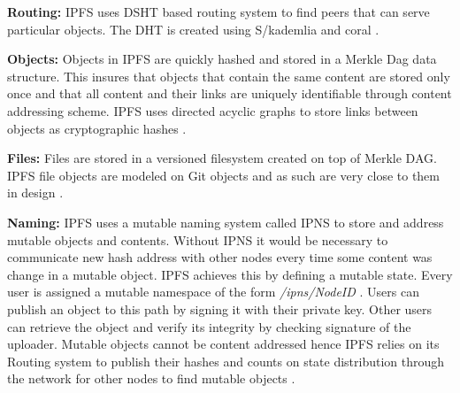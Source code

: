 \textbf{Routing:} IPFS uses DSHT based routing system to find peers that can serve particular objects. The DHT is created using S/kademlia and coral \cite{DBLP:journals/corr/Benet14}.

\textbf{Objects:} Objects in IPFS are quickly hashed and stored in a Merkle Dag data structure. This insures that objects that contain the same content are stored only once and that all content and their links are uniquely identifiable through content addressing scheme. IPFS uses directed acyclic graphs to store links between objects as cryptographic hashes \cite{DBLP:journals/corr/Benet14}.
   
\textbf{Files:} Files are stored in a versioned filesystem created on top of Merkle DAG. IPFS file objects are modeled on Git objects and as such are very close to them in design \cite{DBLP:journals/corr/Benet14}.

\textbf{Naming:} IPFS uses a mutable naming system called IPNS to store and address mutable objects and contents. Without IPNS it would be necessary to communicate new hash address with other nodes every time some content was change in a mutable object. IPFS achieves this by defining a mutable state. Every user is assigned a mutable namespace of the form \textit{/ipns/NodeID} \cite{DBLP:journals/corr/Benet14}. Users can publish an object to this path by signing it with their private key. Other users can retrieve the object and verify its integrity by checking signature of the uploader.  Mutable objects cannot be content addressed hence IPFS relies on its Routing system to publish their hashes and counts on state distribution through the network for other nodes to find mutable objects \cite{DBLP:journals/corr/Benet14}.
 



